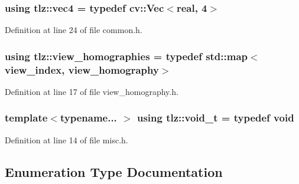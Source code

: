 \subsubsection[{\texorpdfstring{vec4}{vec4}}]{\setlength{\rightskip}{0pt plus 5cm}using {\bf tlz\+::vec4} = typedef cv\+::\+Vec$<${\bf real}, 4$>$}\hypertarget{namespacetlz_a21f82d5e23125980dc143404656a5c90}{}\label{namespacetlz_a21f82d5e23125980dc143404656a5c90}


Definition at line 24 of file common.\+h.

\subsubsection[{\texorpdfstring{view\+\_\+homographies}{view_homographies}}]{\setlength{\rightskip}{0pt plus 5cm}using {\bf tlz\+::view\+\_\+homographies} = typedef std\+::map$<${\bf view\+\_\+index}, {\bf view\+\_\+homography}$>$}\hypertarget{namespacetlz_abd9713860da221719662169bd1821a9d}{}\label{namespacetlz_abd9713860da221719662169bd1821a9d}


Definition at line 17 of file view\+\_\+homography.\+h.

\subsubsection[{\texorpdfstring{void\+\_\+t}{void_t}}]{\setlength{\rightskip}{0pt plus 5cm}template$<$typename... $>$ using {\bf tlz\+::void\+\_\+t} = typedef void}\hypertarget{namespacetlz_a7d87dc9fbb481b3af71497097f545493}{}\label{namespacetlz_a7d87dc9fbb481b3af71497097f545493}


Definition at line 14 of file misc.\+h.



\subsection{Enumeration Type Documentation}
